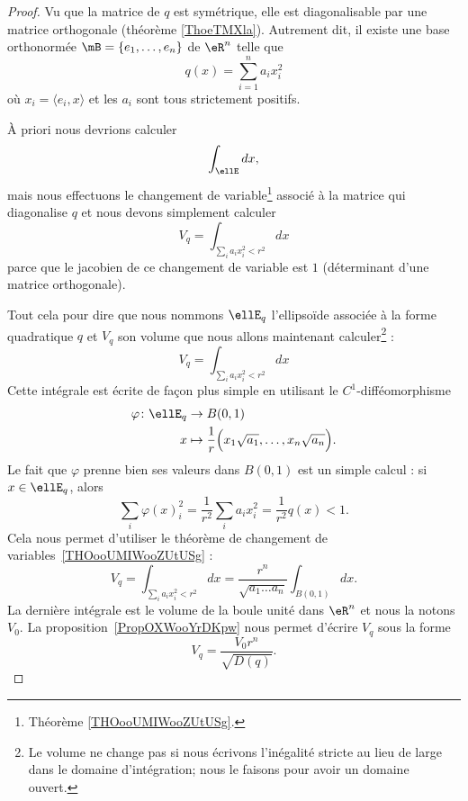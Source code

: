 \begin{proof}
	Vu que la matrice de \( q\) est symétrique, elle est diagonalisable par une matrice orthogonale (théorème \ref{ThoeTMXla}). Autrement dit, il existe une base orthonormée \( \mB=\{ e_1,\ldots, e_n \}\) de \( \eR^n\) telle que
	\begin{equation}    \label{EqELBooQLPQUj}
		q(x)=\sum_{i=1}^na_ix_i^2
	\end{equation}
	où \( x_i=\langle e_i, x\rangle \) et les \( a_i\) sont tous strictement positifs.

	À priori nous devrions calculer
	\begin{equation}
		\int_{\ellE}dx,
	\end{equation}
	mais nous effectuons le changement de variable\footnote{Théorème \ref{THOooUMIWooZUtUSg}.} associé à la matrice qui diagonalise \( q\) et nous devons simplement calculer
	\begin{equation}
		V_q=\int_{\sum_ia_ix_i^2<r^2}dx
	\end{equation}
	parce que le jacobien de ce changement de variable est \( 1\) (déterminant d'une matrice orthogonale).

	Tout cela pour dire que nous nommons \( \ellE_q\) l'ellipsoïde associée à la forme quadratique \( q\) et \( V_q\) son volume que nous allons maintenant calculer\footnote{Le volume ne change pas si nous écrivons l'inégalité stricte au lieu de large dans le domaine d'intégration; nous le faisons pour avoir un domaine ouvert.} :
	\begin{equation}
		V_q=\int_{\sum_ia_ix_i^2<r^2}dx
	\end{equation}
	Cette intégrale est écrite de façon plus simple en utilisant le \( C^1\)-difféomorphisme
	\begin{equation}
		\begin{aligned}
			\varphi\colon \ellE_q & \to B(0,1)                                                             \\
			x                     & \mapsto \frac{1}{  r }\Big( x_1\sqrt{a_1},\ldots, x_n\sqrt{a_n} \Big).
		\end{aligned}
	\end{equation}
	Le fait que \( \varphi\) prenne bien ses valeurs dans \( B(0,1)\) est un simple calcul : si \( x\in\ellE_q\), alors
	\begin{equation}
		\sum_i\varphi(x)_i^2=\frac{1}{ r^2 }\sum_ia_ix_i^2=\frac{1}{ r^2 }q(x)<1.
	\end{equation}
	Cela nous permet d'utiliser le théorème de changement de variables~\ref{THOooUMIWooZUtUSg} :
	\begin{equation}
		V_q=\int_{\sum_ia_ix_i^2<r^2}dx=\frac{r^n}{ \sqrt{a_1\ldots a_n} }\int_{B(0,1)}dx.
	\end{equation}
	La dernière intégrale est le volume de la boule unité dans \( \eR^n\) et nous la notons \( V_0\). La proposition~\ref{PropOXWooYrDKpw} nous permet d'écrire \(V_q\) sous la forme
	\begin{equation}
		V_q=\frac{ V_0 r^n}{ \sqrt{D(q)} }.
	\end{equation}
\end{proof}

